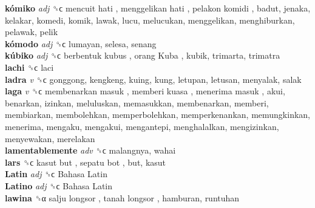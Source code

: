 \textbf{kómiko} \emph{adj}  ␝ϲ   mencuit hati ,  menggelikan hati ,  pelakon komidi , badut, jenaka, kelakar, komedi, komik, lawak, lucu, melucukan, menggelikan, menghiburkan, pelawak, pelik  \\
\textbf{kómodo} \emph{adj}  ␝ϲ  lumayan, selesa, senang  \\
\textbf{kúbiko} \emph{adj}  ␝ϲ   berbentuk kubus ,  orang Kuba , kubik, trimarta, trimatra  \\
\textbf{lachi} ␝ϲ  laci  \\
\textbf{ladra} \emph{v}  ␝ϲ  gonggong, kengkeng, kuing, kung, letupan, letusan, menyalak, salak  \\
\textbf{laga} \emph{v}  ␝ϲ   membenarkan masuk ,  memberi kuasa ,  menerima masuk , akui, benarkan, izinkan, meluluskan, memasukkan, membenarkan, memberi, membiarkan, membolehkan, memperbolehkan, memperkenankan, memungkinkan, menerima, mengaku, mengakui, mengantepi, menghalalkan, mengizinkan, menyewakan, merelakan  \\
\textbf{lamentablemente} \emph{adv}  ␝ϲ  malangnya, wahai  \\
\textbf{lars} ␝ϲ   kasut but ,  sepatu bot , but, kasut  \\
\textbf{Latin} \emph{adj}  ␝ϲ   Bahasa Latin   \\
\textbf{Latino} \emph{adj}  ␝ϲ   Bahasa Latin   \\
\textbf{lawina} ␝α   salju longsor ,  tanah longsor , hamburan, runtuhan  \\
